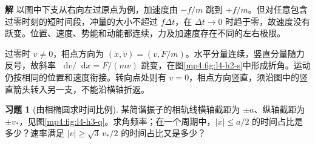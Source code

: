 \documentclass[11pt,openany,fontset=fandol]{ctexbook}
\theoremstyle{definition}\newtheorem{example}{例}[chapter]\newtheorem{exercise}{习题}[chapter]
\newcommand{\SolutionStart}{\par\medskip\ifdim\pagetotal>0pt\ifdim\dimexpr\pagegoal-\pagetotal\relax<3\baselineskip\newpage\fi\fi\noindent\textbf{解}\quad\ignorespaces}
\newenvironment{solution}{\SolutionStart}{\par\medskip}
\newcommand{\dd}{\mathop{}\!\mathrm d}\newcommand{\ee}{\mathrm e}\newcommand{\vct}[1]{\bm{#1}}
\begin{document}
\begin{solution}
以图中下支从右向左过原点为例，加速度由 $-f/m$ 跳到 $+f/m$。但对任意包含过零时刻的短时间段，冲量的大小不超过 $f\Delta t$，在 $\Delta t\to0$ 时趋于零，故速度没有跃变。位置、速度、势能和动能都连续，力及加速度存在不同的左右极限。

过零时 $v\ne0$，相点方向为 $(\dot x,\dot v)=(v,F/m)$。水平分量连续，竖直分量随力反号，故斜率 $\dd v/\dd x=F/(mv)$ 跳变，在图\ref{mp4:fig:l4-h2-s}中形成折角。运动仍按相同的位置和速度衔接。转向点处则有 $v=0$，相点方向竖直，须沿图中的竖直箭头转入另一支，不能沿横轴折返。
\end{solution}

\par\medskip\noindent\begin{minipage}{\textwidth}
\begin{exercise}[由相椭圆求时间比例]\label{mp4:exercise:l4-h3}
某简谐振子的相轨线横轴截距为 $\pm a$、纵轴截距为 $\pm v_*$，见图\ref{mp4:fig:l4-h3-q}。求角频率；在一个周期中，$|x|\le a/2$ 的时间占比是多少？速率满足 $|v|\ge\sqrt3\,v_*/2$ 的时间占比又是多少？
\end{exercise}


\end{minipage}
\end{document}
